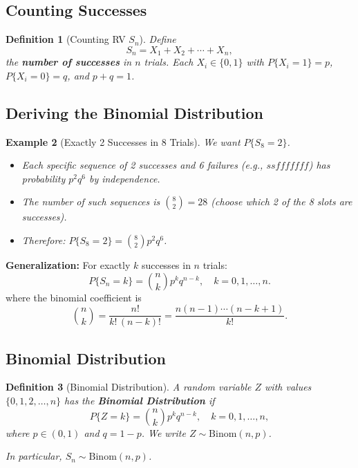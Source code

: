 \documentclass[12pt]{article}
\theoremstyle{definition_style}
\newtheorem{defn}{Definition}[section]
\newtheorem{example}[defn]{Example}
\begin{document}
\subsection{Counting Successes}

\begin{defn}[Counting RV $S_n$]
Define
\[
    S_n = X_1 + X_2 + \cdots + X_n,
\]
the \textbf{number of successes} in $n$ trials. Each $X_i \in \{0,1\}$ with $P\{X_i = 1\} = p$, $P\{X_i = 0\} = q$, and $p + q = 1$.
\end{defn}

\subsection{Deriving the Binomial Distribution}

\begin{example}[Exactly 2 Successes in 8 Trials]
We want $P\{S_8 = 2\}$.
\begin{itemize}
    \item Each specific sequence of 2 successes and 6 failures (e.g., $ssfffffff$) has probability $p^2 q^6$ by independence.
    \item The number of such sequences is $\binom{8}{2} = 28$ (choose which 2 of the 8 slots are successes).
    \item Therefore: $P\{S_8 = 2\} = \binom{8}{2} p^2 q^6$.
\end{itemize}
\end{example}

\textbf{Generalization:} For exactly $k$ successes in $n$ trials:
\[
    P\{S_n = k\} = \binom{n}{k} p^k q^{n-k}, \quad k = 0, 1, \ldots, n.
\]
where the binomial coefficient is
\[
    \binom{n}{k} = \frac{n!}{k!\,(n-k)!} = \frac{n(n-1)\cdots(n-k+1)}{k!}.
\]

\subsection{Binomial Distribution}

\begin{defn}[Binomial Distribution]
A random variable $Z$ with values $\{0, 1, 2, \ldots, n\}$ has the \textbf{Binomial Distribution} if
\[
    P\{Z = k\} = \binom{n}{k} p^k q^{n-k}, \quad k = 0, 1, \ldots, n,
\]
where $p \in (0,1)$ and $q = 1-p$. We write $Z \sim \mathrm{Binom}(n, p)$.

In particular, $S_n \sim \mathrm{Binom}(n, p)$.
\end{defn}
\end{document}
